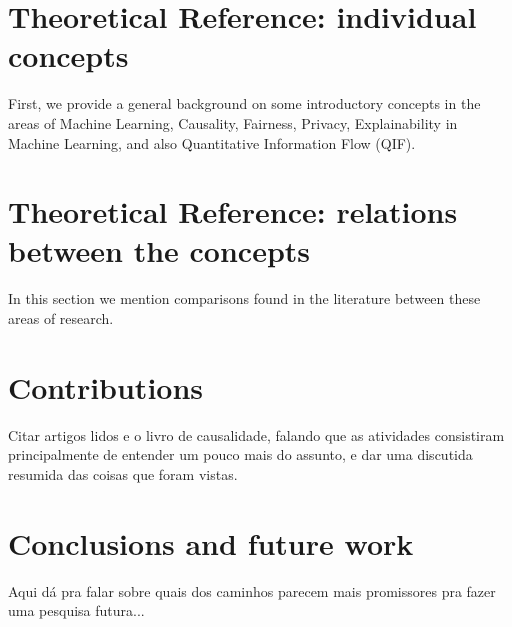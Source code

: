 \documentclass{article}
\begin{document}
\section{Theoretical Reference: individual concepts}\label{sec:theoRef1}

First, we provide a general background on some introductory concepts in the areas of Machine Learning, Causality, Fairness, Privacy, Explainability in Machine Learning, and also Quantitative Information Flow (QIF).



\section{Theoretical Reference: relations between the concepts}\label{sec:theoRef2}

In this section we mention comparisons found in the literature between these areas of research.



\section{Contributions}\label{sec:contribs}

{\color{red} Citar artigos lidos e o livro de causalidade, falando que as atividades consistiram principalmente de entender um pouco mais do assunto, e dar uma discutida resumida das coisas que foram vistas.}

\section{Conclusions and future work}\label{sec:concsFuture}

{\color{red} Aqui dá pra falar sobre quais dos caminhos parecem mais promissores pra fazer uma pesquisa futura...}




\end{document}
